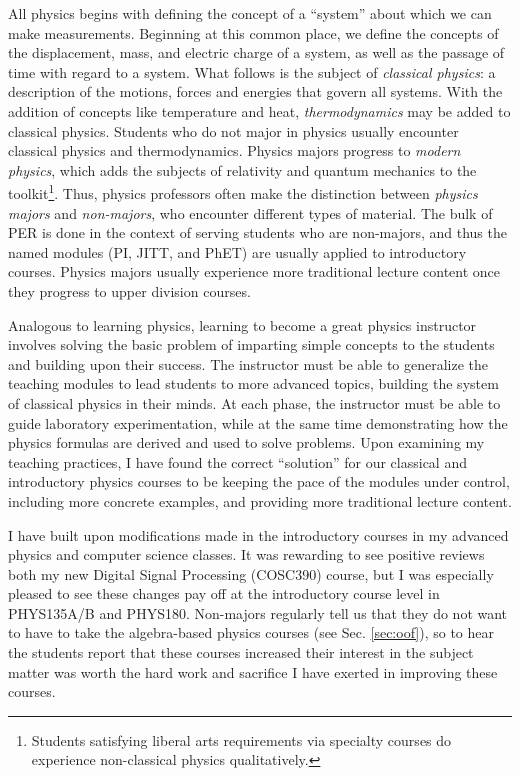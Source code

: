 \documentclass[../../main.tex]{subfiles}
\begin{document}
All physics begins with defining the concept of a ``system'' about which we can make measurements.  Beginning at this common place, we define the concepts of the displacement, mass, and electric charge of a system, as well as the passage of time with regard to a system.  What follows is the subject of \textit{classical physics}: a description of the motions, forces and energies that govern all systems.  With the addition of concepts like temperature and heat, \textit{thermodynamics} may be added to classical physics.  Students who do not major in physics usually encounter classical physics and thermodynamics.  Physics majors progress to \textit{modern physics}, which adds the subjects of relativity and quantum mechanics to the toolkit\footnote{Students satisfying liberal arts requirements via specialty courses do experience non-classical physics qualitatively.}.  Thus, physics professors often make the distinction between \textit{physics majors} and \textit{non-majors}, who encounter different types of material.  The bulk of PER is done in the context of serving students who are non-majors, and thus the named modules (PI, JITT, and PhET) are usually applied to introductory courses.  Physics majors usually experience more traditional lecture content once they progress to upper division courses.  \\ \hspace{0.1cm}

Analogous to learning physics, learning to become a great physics instructor involves solving the basic problem of imparting simple concepts to the students and building upon their success.  The instructor must be able to generalize the teaching modules to lead students to more advanced topics, building the system of classical physics in their minds.  At each phase, the instructor must be able to guide laboratory experimentation, while at the same time demonstrating how the physics formulas are derived and used to solve problems.  Upon examining my teaching practices, I have found the correct ``solution'' for our classical and introductory physics courses to be keeping the pace of the modules under control, including more concrete examples, and providing more traditional lecture content.  \\ \hspace{0.1cm}

I have built upon modifications made in the introductory courses in my advanced physics and computer science classes.  It was rewarding to see positive reviews both my new Digital Signal Processing (COSC390) course, but I was especially pleased to see these changes pay off at the introductory course level in PHYS135A/B and PHYS180.  Non-majors regularly tell us that they do not want to have to take the algebra-based physics courses (see Sec. \ref{sec:oof}), so to hear the students report that these courses increased their interest in the subject matter was worth the hard work and sacrifice I have exerted in improving these courses.
\end{document}
